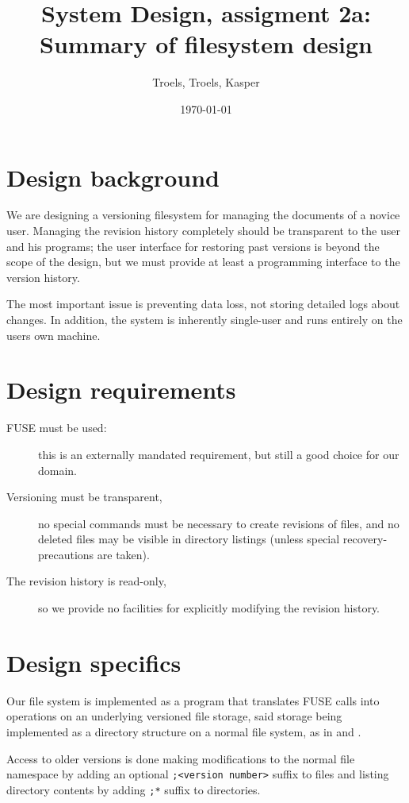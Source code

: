\documentclass[12pt]{article}
\author{
        Troels, Troels, Kasper
}
\date{\today}
\title{System Design, assigment 2a:\\Summary of filesystem design}
\begin{document}
 
\maketitle
 
\section{Design background}

We are designing a versioning filesystem for managing the documents of
a novice user.  Managing the revision history completely should be
transparent to the user and his programs; the user interface for
restoring past versions is beyond the scope of the design, but we must
provide at least a programming interface to the version history.

The most important issue is preventing data loss, not storing detailed
logs about changes.  In addition, the system is inherently single-user
and runs entirely on the users own machine.

\section{Design requirements}

\begin{description}
\item[FUSE must be used:] this is an externally mandated requirement,
  but still a good choice for our domain.
\item[Versioning must be transparent,] no special commands must be
  necessary to create revisions of files, and no deleted files may be
  visible in directory listings (unless special recovery-precautions
  are taken).
\item[The revision history is read-only,] so we provide no facilities
  for explicitly modifying the revision history.
\end{description}

\section{Design specifics}

Our file system is implemented as a program that translates FUSE calls
into operations on an underlying versioned file storage, said storage
being implemented as a directory structure on a normal file system, as
in \cite{1096690} and \cite{Bustamante04wayback:a}.

Access to older versions is done making modifications to the normal file 
namespace by adding an optional \texttt{;<version number>} suffix to files
and listing directory contents by adding \texttt{;*} suffix to directories.
\end{document}
